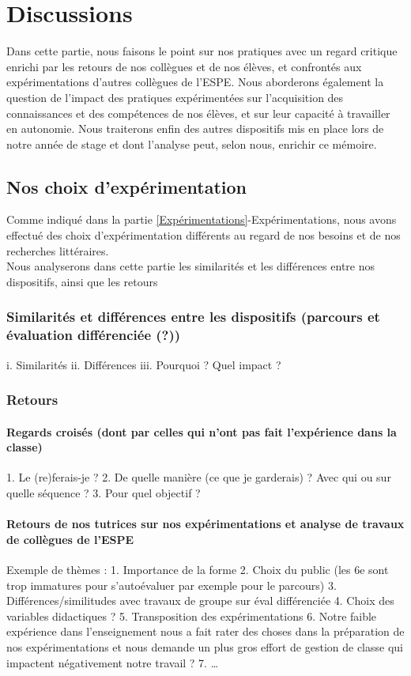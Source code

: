 \section{Discussions}
Dans cette partie, nous faisons le point sur nos pratiques avec un regard critique enrichi par les retours de nos collègues et de nos élèves, et confrontés aux expérimentations d'autres collègues de l'ESPE. Nous aborderons également la question de l'impact des pratiques expérimentées sur l'acquisition des connaissances et des compétences de nos élèves, et sur leur capacité à travailler en autonomie. Nous traiterons enfin des autres dispositifs mis en place lors de notre année de stage et dont l'analyse peut, selon nous, enrichir ce mémoire.
\subsection{Nos choix d'expérimentation}	
Comme indiqué dans la partie \ref{Expérimentations}-Expérimentations, nous avons effectué des choix d'expérimentation différents au regard de nos besoins et de nos recherches littéraires.\\
Nous analyserons dans cette partie les similarités et les différences entre nos dispositifs, ainsi que les retours
\subsubsection{Similarités et différences entre les dispositifs (parcours et évaluation différenciée (?))}
i.	Similarités
ii.	Différences
iii.	Pourquoi ? Quel impact ?
\subsubsection{Retours}
\paragraph*{Regards croisés (dont par celles qui n’ont pas fait l’expérience dans la classe)}
1.	Le (re)ferais-je ?
2.	De quelle manière (ce que je garderais) ? Avec qui ou sur quelle séquence ?
3.	Pour quel objectif ?
\paragraph*{Retours de nos tutrices sur nos expérimentations et analyse de travaux de collègues de l’ESPE}
Exemple de thèmes :
1.	Importance de la forme
2.	Choix du public 
(les 6e sont trop immatures pour s’autoévaluer par exemple pour le parcours)
3.	Différences/similitudes avec travaux de groupe sur éval différenciée
4.	Choix des variables didactiques ?
5.	Transposition des expérimentations
6.	Notre faible expérience dans l’enseignement nous a fait rater des choses dans la préparation de nos expérimentations et nous demande un plus gros effort de gestion de classe qui impactent négativement notre travail ?
7.	 \ldots
